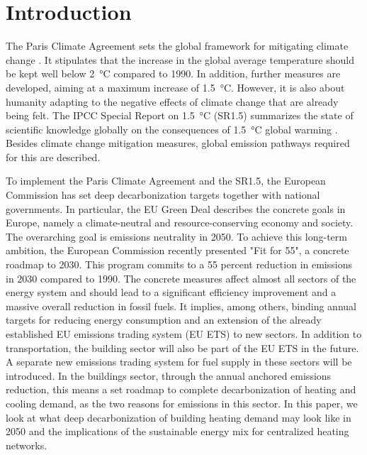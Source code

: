 \section{Introduction}
The Paris Climate Agreement sets the global framework for mitigating climate change \cite{agreement2015paris}. It stipulates that the increase in the global average temperature should be kept well below \SI{2}{\degreeCelsius} compared to 1990. In addition, further measures are developed, aiming at a maximum increase of \SI{1.5}{\degreeCelsius}. However, it is also about humanity adapting to the negative effects of climate change that are already being felt. The IPCC Special Report on \SI{1.5}{\degreeCelsius} (SR1.5) summarizes the state of scientific knowledge globally on the consequences of \SI{1.5}{\degreeCelsius} global warming \cite{edenhofer2011ipcc}. Besides climate change mitigation measures, global emission pathways required for this are described.\newline

To implement the Paris Climate Agreement and the SR1.5, the European Commission has set deep decarbonization targets together with national governments. In particular, the EU Green Deal describes the concrete goals in Europe, namely a climate-neutral and resource-conserving economy and society. The overarching goal is emissions neutrality in 2050. To achieve this long-term ambition, the European Commission recently presented "Fit for 55", a concrete roadmap to 2030. This program commits to a 55 percent reduction in emissions in 2030 compared to 1990. The concrete measures affect almost all sectors of the energy system and should lead to a significant efficiency improvement and a massive overall reduction in fossil fuels. It implies, among others, binding annual targets for reducing energy consumption and an extension of the already established EU emissions trading system (EU ETS) to new sectors. In addition to transportation, the building sector will also be part of the EU ETS in the future. A separate new emissions trading system for fuel supply in these sectors will be introduced. In the buildings sector, through the annual anchored emissions reduction, this means a set roadmap to complete decarbonization of heating and cooling demand, as the two reasons for emissions in this sector. In this paper, we look at what deep decarbonization of building heating demand may look like in 2050 and the implications of the sustainable energy mix for centralized heating networks.\newline

